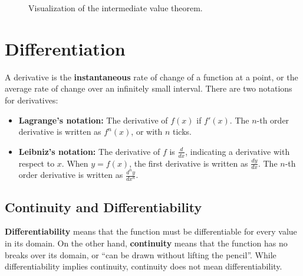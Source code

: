 \documentclass[12pt]{article}
\begin{document}
\begin{figure}[H]
	\begin{center}
	\end{center}
	\label{fig:inter_value_theorem}
	\caption{Visualization of the intermediate value theorem.}
\end{figure}

\section{Differentiation}
A derivative is the \textbf{instantaneous} rate of change of a function at a point, or the average rate of change over an infinitely small interval. There are two notations for derivatives:

\begin{itemize}
	\item \textbf{Lagrange's notation:} The derivative of $f(x)$ if $f'(x)$. The $n$-th order derivative is written as $f^n(x)$, or with $n$ ticks.
	\item \textbf{Leibniz's notation:} The derivative of $f$ is $\frac{d}{dx}$, indicating a derivative with respect to $x$. When $y = f(x)$,  the first derivative is written as $\frac{dy}{dx}$. The $n$-th order derivative is written as $\frac{d^n y}{dx^n}$.
\end{itemize}

\subsection{Continuity and Differentiability}
\textbf{Differentiability} means that the function must be differentiable for every value in its domain. On the other hand, \textbf{continuity} means that the function has no breaks over its domain, or ``can be drawn without lifting the pencil''. While differentiability implies continuity, continuity does not mean differentiability.
\end{document}
